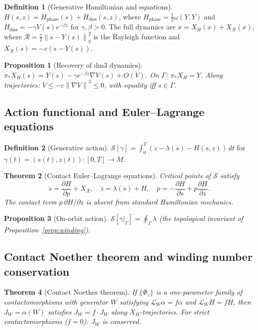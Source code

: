 \documentclass[12pt, oneside]{book}
\theoremstyle{plain}
\newtheorem{theorem}{Theorem}[section]
\newtheorem{proposition}[theorem]{Proposition}
\theoremstyle{definition}
\newtheorem{definition}{Definition}[section]
\theoremstyle{remark}
\newcommand{\Orb}{\Gamma}
\newcommand{\cS}{\mathcal{S}}
\newcommand{\cR}{\mathcal{R}}
\newcommand{\eps}{\varepsilon}
\newcommand{\norm}[1]{\left\|#1\right\|}
\begin{document}
\begin{definition}[Generative Hamiltonian and equations]\label{def:H}
$H(s,z)=H_{\mathrm{phase}}(s)+H_{\mathrm{diss}}(s,z)$,
where $H_{\mathrm{phase}}=\tfrac12\omega(Y,Y)$ and
$H_{\mathrm{diss}}=-\gamma V(s)e^{-\beta z}$ for $\gamma,\beta>0$.
The full dynamics are $\dot x=X_H(x)+X_{\cR}(x)$, where
$\cR=\tfrac{c}{2}\norm{\dot s-Y(s)}_g^2$ is the Rayleigh function
and $X_{\cR}(s)=-c(\dot s-Y(s))$.
\end{definition}

\begin{proposition}[Recovery of dm3 dynamics]\label{prop:recovery}
$\pi_*X_H(s)=Y(s)-\gamma e^{-\beta z}\nabla V(s)+O(V)$.
On $\Orb$: $\pi_*X_H=Y$.
Along trajectories: $\dot V\le -c\norm{\nabla V}^2\le 0$,
with equality iff $s\in\Orb$.
\end{proposition}

\subsection{Action functional and Euler--Lagrange equations}

\begin{definition}[Generative action]\label{def:action}
$\cS[\gamma]=\int_0^T(\dot z-\lambda(\dot s)-H(s,z))\,dt$
for $\gamma(t)=(s(t),z(t))\colon[0,T]\to M$.
\end{definition}

\begin{theorem}[Contact Euler--Lagrange equations]\label{thm:EL}
Critical points of $\cS$ satisfy
\[
  \dot s=\frac{\partial H}{\partial p}+X_{\cR},\quad
  \dot z=\lambda(\dot s)+H,\quad
  \dot p=-\frac{\partial H}{\partial s}+p\frac{\partial H}{\partial z}.
\]
The contact term $p\,\partial H/\partial z$ is absent from standard
Hamiltonian mechanics.
\end{theorem}

\begin{proposition}[On-orbit action]\label{prop:orbit-action}
$\cS[\gamma|_\Orb]=\oint_\Orb\lambda$ (the topological invariant
of Proposition~\ref{prop:winding}).
\end{proposition}

\subsection{Contact Noether theorem and winding number conservation}

\begin{theorem}[Contact Noether theorem]\label{thm:noether}
If $\{\Phi_\eps\}$ is a one-parameter family of contactomorphisms
with generator $W$ satisfying $\mathcal{L}_W\alpha=f\alpha$ and
$\mathcal{L}_W H=fH$, then $J_W=\alpha(W)$ satisfies
$\dot J_W=f\cdot J_W$ along $X_H$-trajectories.
For strict contactomorphisms ($f=0$): $J_W$ is conserved.
\end{theorem}
\end{document}
